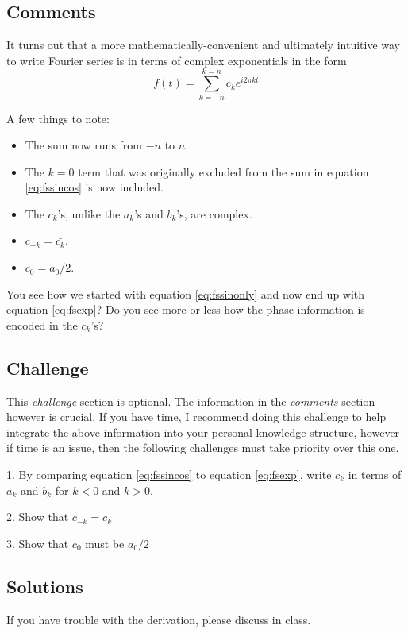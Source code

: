 \subsection*{Comments}
It turns out that a more mathematically-convenient and ultimately intuitive way to write Fourier series is in terms of complex exponentials in the form
\begin{equation}
    \label{eq:fsexp}
    f(t) = \sum_{k=-n}^{k=n} c_k e^{i 2 \pi k t}
\end{equation}

A few things to note:
\begin{itemize}
    \item The sum now runs from $-n$ to $n$.
    \item The $k=0$ term that was originally excluded from the sum in equation \ref{eq:fssincos} is now included.
    \item The $c_k$'s, unlike the $a_k$'s and $b_k$'s, are complex.
    \item $c_{-k} = \bar{c_k}$.
    \item $c_0 = a_0/2$.
\end{itemize}

You see how we started with equation \ref{eq:fssinonly} and now end up with equation \ref{eq:fsexp}? Do you see more-or-less how the phase information is encoded in the $c_k$'s?

\subsection*{Challenge}
This \emph{challenge} section is optional. The information in the \emph{comments} section however is crucial. If you have time, I recommend doing this challenge to help integrate the above information into your personal knowledge-structure, however if time is an issue, then the following challenges must take priority over this one.

1. By comparing equation \ref{eq:fssincos} to equation \ref{eq:fsexp}, write $c_k$ in terms of $a_k$ and $b_k$ for $k<0$ and $k>0$.

2. Show that $c_{-k} = \bar{c_k}$

3. Show that $c_0$ must be $a_0/2$

\subsection*{Solutions}
If you have trouble with the derivation, please discuss in class.




